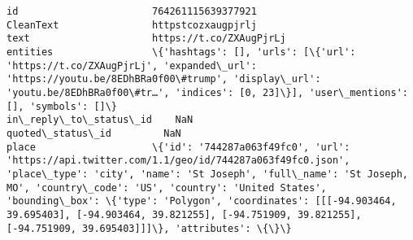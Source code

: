 \documentclass[11pt]{article}
\begin{document}
\begin{Verbatim}[commandchars=\\\{\}]
id                       764261115639377921                                                                                                                                                                                                                                                                                                                                                                                    
CleanText                httpstcozxaugpjrlj                                                                                                                                                                                                                                                                                                                                                                                    
text                     https://t.co/ZXAugPjrLj                                                                                                                                                                                                                                                                                                                                                                               
entities                 \{'hashtags': [], 'urls': [\{'url': 'https://t.co/ZXAugPjrLj', 'expanded\_url': 'https://youtu.be/8EDhBRa0f00\#trump', 'display\_url': 'youtu.be/8EDhBRa0f00\#tr…', 'indices': [0, 23]\}], 'user\_mentions': [], 'symbols': []\}                                                                                                                                                                               
in\_reply\_to\_status\_id    NaN                                                                                                                                                                                                                                                                                                                                                                                                   
quoted\_status\_id         NaN                                                                                                                                                                                                                                                                                                                                                                                                   
place                    \{'id': '744287a063f49fc0', 'url': 'https://api.twitter.com/1.1/geo/id/744287a063f49fc0.json', 'place\_type': 'city', 'name': 'St Joseph', 'full\_name': 'St Joseph, MO', 'country\_code': 'US', 'country': 'United States', 'bounding\_box': \{'type': 'Polygon', 'coordinates': [[[-94.903464, 39.695403], [-94.903464, 39.821255], [-94.751909, 39.821255], [-94.751909, 39.695403]]]\}, 'attributes': \{\}\}

\end{Verbatim}
\end{document}
